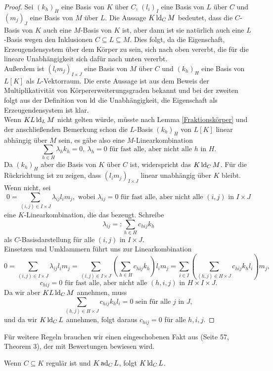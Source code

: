     \begin{proof}
    	Sei $(k_h)_H$ eine Basis von $K$ über $C$, $(l_i)_I$ eine Basis von $L$ über $C$ und $(m_j)_J$ eine Basis von $M$ über $L$. Die Aussage $K\operatorname{ld}_CM$ bedeutet, dass die $C$-Basis von $K$ auch eine $M$-Basis von $K$ ist, aber dann ist sie natürlich auch eine $L$-Basis wegen den Inklusionen $C\subseteq L\subseteq M$. Dies folgt, da die Eigenschaft, Erzeugendensystem über dem Körper zu sein, sich nach oben vererbt, die für die lineare Unabhängigkeit sich dafür nach unten vererbt.\\
    	Außerdem ist $(l_im_j)_{I\times J}$ eine Basis von $M$ über $C$ und $(k_h)_H$ eine Basis von $L[K]$ als $L$-Vektorraum. Die erste Aussage ist aus dem Beweis der Multiplikativität von Körpererweiterungsgraden bekannt und bei der zweiten folgt aus der Definition von $\operatorname{ld}$ die Unabhängigkeit, die Eigenschaft als Erzeugendensystem ist klar.\\
    	Wenn $KL\operatorname{ld}_LM$ nicht gelten würde, müsste nach Lemma \ref{Fraktionskörper} und der anschließenden Bemerkung schon die $L$-Basis $(k_h)_H$ von $L[K]$ linear abhängig über $M$ sein, es gäbe also eine $M$-Linearkombination $$\sum\limits_{h\in H}\lambda_hk_h=0,\ \lambda_h=0\text{ für fast alle, aber nicht alle } h\text{ in }H.$$
    	Da $(k_h)_H$ aber die Basis von $K$ über $C$ ist, widerspricht das $K\operatorname{ld}_CM$.\newpage
    	Für die Rückrichtung ist zu zeigen, dass $(l_im_j)_{I\times J}$ linear unabhängig über $K$ bleibt. Wenn nicht, sei $$0=\sum\limits_{(i,j)\in I\times J}\lambda_{ij}l_im_j,\text{ wobei }\lambda_{ij}=0\text{ für fast alle, aber nicht alle } (i,j)\text{ in }I\times J$$ eine $K$-Linearkombination, die das bezeugt. Schreibe $$\lambda_{ij}=:\sum\limits_{h\in H}c_{hij}k_h$$ als $C$-Basisdarstellung für alle $(i,j)$ in $I\times J$.\\
    	Einsetzen und Umklammern führt uns zur Linearkombination $$0=\sum\limits_{(i,j)\in I\times J}\lambda_{ij}l_im_j=\sum\limits_{(i,j)\in I\times J}\left(\sum\limits_{h\in H} c_{hij}k_h\right)l_im_j=\sum\limits_{i\in I}\left(\sum\limits_{(h,j)\in H\times J}c_{hij}k_hl_i\right)m_j,$$ $$c_{hij}=0\text{ für fast alle, aber nicht alle } (h,i,j)\text{ in }H\times I\times J.$$
    	Da wir aber $KL\operatorname{ld}_CM$ annehmen, muss $$\sum\limits_{(h,j)\in H\times J}c_{hij}k_hl_i=0\text{ sein für alle }j\text{ in }J,$$ und da wir $K\operatorname{ld}_CL$ annehmen, folgt daraus $c_{hij}=0$ für alle $h,i,j$.
    \end{proof}
    
    Für weitere Regeln brauchen wir einen eingeschobenen Fakt aus \cite{SergeLang} (Seite 57, Theorem 3), der mit Bewertungen bewiesen wird.
    \begin{fact}\label{Das komplizierte Lemma}
    	Wenn $C\subseteq K$ regulär ist und $K\operatorname{ad}_CL$, folgt $K\operatorname{ld}_CL$.
    \end{fact}
    
